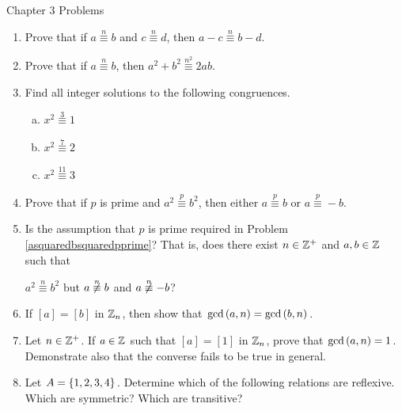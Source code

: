 \documentclass[11pt,fleqn,dvipsnames,usenames]{article}
\renewcommand{\headrulewidth}{1pt}
\begin{document}
\fancyhead[L]{\course}
\fancyhead[R]{\term}
\renewcommand{\headrulewidth}{0.4pt}

{\huge Chapter 3 Problems}
\vsp

\begin{enumerate}
\item Prove that if $a\overset{n}{\equiv}b$ and $c\overset{n}{\equiv}d$, then $a-c\overset{n}{\equiv}b-d$.
\item Prove that if $a\overset{n}{\equiv}b$, then $a^2 + b^2\overset{n^2}{\equiv}2ab$.
\item Find all integer solutions to the following congruences.
\begin{multicols}{3}
\begin{enumerate}[(a)]
\item $x^2\overset{3}{\equiv}1$
\item $x^2\overset{7}{\equiv}2$
\item $x^2\overset{11}{\equiv}3$
\end{enumerate}
\end{multicols}
\item \label{asquaredbsquaredpprime}Prove that if $p$ is prime and $a^2\overset{p}{\equiv}b^2$, then either $a\overset{p}{\equiv}b$ or $a\overset{p}{\equiv}-b$.
\item Is the assumption that $p$ is prime required in Problem \ref{asquaredbsquaredpprime}?  That is, does there exist $n\in\mathbb{Z}^{+}$ and $a,b\in\mathbb{Z}$ such that
\begin{center}
$a^2\overset{n}{\equiv}b^2$ but $a\not\overset{n}{\equiv}b$ and $a\not\overset{n}{\equiv}-b$?
\end{center}
\item If $[a] = [b]$ in $\mathbb{Z}_{n}$, then show that $\text{gcd}\left(a,n\right) = \text{gcd}\left(b,n\right)$.
\item Let $n\in\mathbb{Z}^{+}$.  If $a\in \mathbb{Z}$ such that $[a] = [1]$ in $\mathbb{Z}_{n}$, prove that $\text{gcd}\left(a,n\right) = 1$.  Demonstrate also that the converse fails to be true in general.
\item Let $A = \left\{1,2,3,4\right\}$.  Determine which of the following relations are reflexive.  Which are symmetric?  Which are transitive?
\begin{enumerate}[(a)]

\end{enumerate}
\end{enumerate}
\end{document}
